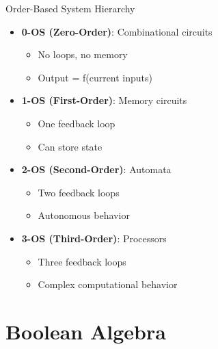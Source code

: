 \documentclass[aspectratio=169,11pt]{beamer}
\newcommand{\concept}[1]{\textbf{\color{accentcolor}#1}}
\begin{document}
\begin{frame}{Order-Based System Hierarchy}
\begin{itemize}
\item \concept{0-OS (Zero-Order)}: Combinational circuits
\begin{itemize}
\item No loops, no memory
\item Output = f(current inputs)
\end{itemize}
\vspace{0.3cm}
\item \concept{1-OS (First-Order)}: Memory circuits
\begin{itemize}
\item One feedback loop
\item Can store state
\end{itemize}
\vspace{0.3cm}
\item \concept{2-OS (Second-Order)}: Automata
\begin{itemize}
\item Two feedback loops
\item Autonomous behavior
\end{itemize}
\vspace{0.3cm}
\item \concept{3-OS (Third-Order)}: Processors
\begin{itemize}
\item Three feedback loops
\item Complex computational behavior
\end{itemize}
\end{itemize}
\end{frame}

\section{Boolean Algebra}
\end{document}
